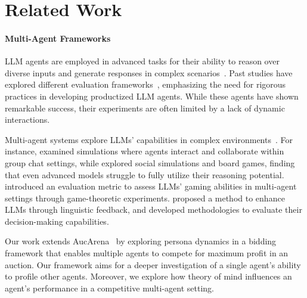 \section{Related Work}
\label{sec:related}

\paragraph{Multi-Agent Frameworks}\;
LLM agents are employed in advanced tasks for their ability to reason over diverse inputs and generate responses in complex scenarios~\cite{wei2022chain, caoyun2024canllm, liu2024agentbench, shinn2024reflexion}. Past studies have explored different evaluation frameworks~\cite{debenedetti2024agentdojo, ye2024justice, asgari2024mmlupro}, emphasizing the need for rigorous practices in developing productized LLM agents. While these agents have shown remarkable success, their experiments are often limited by a lack of dynamic interactions.

Multi-agent systems explore LLMs' capabilities in complex environments~\cite{wu2024autogen, huang2024far, zhao2024competeai, wu-etal-2024-shall}. For instance, \citet{gu2024agent} examined simulations where agents interact and collaborate within group chat settings, while \citet{zhang2024llmmastermindsurveystrategic} explored social simulations and board games, finding that even advanced models struggle to fully utilize their reasoning potential. \citet{huang2024far} introduced an evaluation metric to assess LLMs' gaming abilities in multi-agent settings through game-theoretic experiments. \citet{shinn2024reflexion} proposed a method to enhance LLMs through linguistic feedback, and \citet{huang2024far} developed methodologies to evaluate their decision-making capabilities.

Our work extends AucArena~\cite{chen2023put} by exploring persona dynamics in a bidding framework that enables multiple agents to compete for maximum profit in an auction. Our framework aims for a deeper investigation of a single agent's ability to profile other agents. Moreover, we explore how theory of mind influences an agent's performance in a competitive multi-agent setting.

\vspace{-0.05in}
